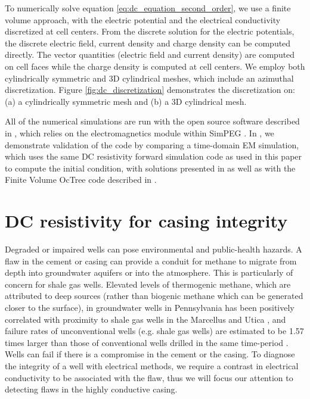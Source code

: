 \documentclass[extra,mreferee]{gji}
\begin{document}
To numerically solve equation \ref{eq:dc_equation_second_order}, we use a finite volume approach, with the electric potential and the electrical conductivity discretized at cell centers. From the discrete solution for the electric potentials, the discrete electric field, current density and charge density can be computed directly. The vector quantities (electric field and current density) are computed on cell faces while the charge density is computed at cell centers. We employ both cylindrically symmetric and 3D cylindrical meshes, which include an azimuthal discretization. Figure \ref{fig:dc_discretization} demonstrates the discretization on:  (a) a cylindrically symmetric mesh and (b) a 3D cylindrical mesh.




All of the numerical simulations are run with the open source software described in \citep{Heagy2018a}, which relies on the electromagnetics module within SimPEG \citep{Cockett2015, Heagy2017}. In \cite{Heagy2018a}, we demonstrate validation of the code by comparing a time-domain EM simulation, which uses the same DC resistivity forward simulation code as used in this paper to compute the initial condition, with solutions presented in \cite{Commer2015} as well as with the Finite Volume OcTree code described in \cite{Haber2007}.


\section{DC resistivity for casing integrity}
\label{sec:casing_integrity}

Degraded or impaired wells can pose environmental and public-health hazards. A flaw in the cement or casing can provide a conduit for methane to migrate from depth into groundwater aquifers or into the atmosphere. This is particularly of concern for shale gas wells. Elevated levels of thermogenic methane, which are attributed to deep sources (rather than biogenic methane which can be generated closer to the surface), in groundwater wells in Pennsylvania has been positively correlated with proximity to shale gas wells in the Marcellus and Utica \citep{Osborn2011, Jackson2013}, and failure rates of unconventional wells (e.g. shale gas wells) are estimated to be 1.57 times larger than those of conventional wells drilled in the same time-period \citep{Ingraffea2014}. Wells can fail if there is a compromise in the cement or the casing. To diagnose the integrity of a well with electrical methods, we require a contrast in electrical conductivity to be associated with the flaw, thus we will focus our attention to detecting flaws in the highly conductive casing.
\end{document}
